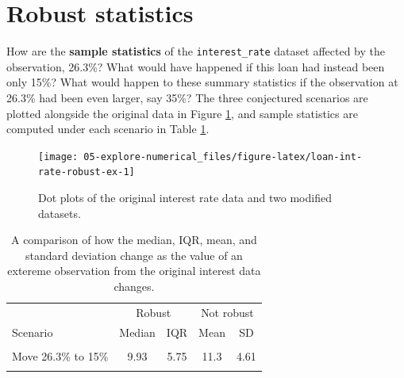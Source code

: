 \documentclass[
  10pt,
  openany]{book}
\begin{document}
\hypertarget{robust-statistics}{%
\section{Robust statistics}\label{robust-statistics}}

How are the \textbf{sample statistics}  of the \texttt{interest\_rate} dataset affected by the observation, 26.3\%?
What would have happened if this loan had instead been only 15\%?
What would happen to these summary statistics  if the observation at 26.3\% had been even larger, say 35\%?
The three conjectured scenarios are plotted alongside the original data in Figure \ref{fig:loan-int-rate-robust-ex}, and sample statistics are computed under each scenario in Table \ref{tab:robustOrNotTable}.

\begin{figure}[h]

{\centering \texttt{[image: 05-explore-numerical\_files/figure-latex/loan-int-rate-robust-ex-1]} 

}

\caption{Dot plots of the original interest rate data and two modified datasets.}\label{fig:loan-int-rate-robust-ex}
\end{figure}

\begin{table}[!h]

\caption{\label{tab:robustOrNotTable}A comparison of how the median, IQR, mean, and standard deviation change as the value of an extereme observation from the original interest data changes.}
\centering
\begin{tabular}[t]{lcccc}
\toprule
\multicolumn{1}{c}{ } & \multicolumn{2}{c}{Robust} & \multicolumn{2}{c}{Not robust} \\
\cmidrule(l{3pt}r{3pt}){2-3} \cmidrule(l{3pt}r{3pt}){4-5}
Scenario & Median & IQR & Mean & SD\\
\midrule
\cellcolor{gray!6}{Original data} & \cellcolor{gray!6}{9.93} & \cellcolor{gray!6}{5.75} & \cellcolor{gray!6}{11.6} & \cellcolor{gray!6}{5.05}\\
Move 26.3\% to 15\% & 9.93 & 5.75 & 11.3 & 4.61\\
\cellcolor{gray!6}{Move 26.3\% to 35\%} & \cellcolor{gray!6}{9.93} & \cellcolor{gray!6}{5.75} & \cellcolor{gray!6}{11.7} & \cellcolor{gray!6}{5.68}\\
\bottomrule
\end{tabular}
\end{table}
\end{document}
